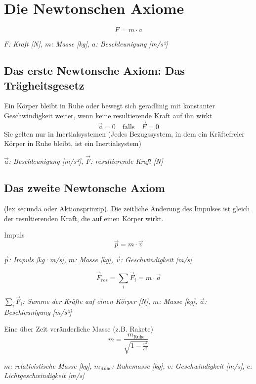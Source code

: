 \documentclass[a4paper,10pt]{article}
\newenvironment{displayformula}
{
	\begin{framed}
		\color{formulaColor}
	}
	{\end{framed}}
\newcommand{\formulalegend}[1]{%
	\par\vspace{0.5ex}%
	{{\color{legendColor}\RaggedRight\small\textit{#1}}}%
	\par\vspace{1.5ex}%
}
\begin{document}
\section{Die Newtonschen Axiome}

\begin{displayformula}
	\[
	F = m \cdot a
	\]
\end{displayformula}
\formulalegend{
	\( F \): Kraft [N], \( m \): Masse [kg], \( a \): Beschleunigung [m/s²]
}

\subsection{Das erste Newtonsche Axiom: Das Trägheitsgesetz}

\begin{displayformula}
	Ein Körper bleibt in Ruhe oder bewegt sich geradlinig mit konstanter Geschwindigkeit weiter, wenn keine resultierende Kraft auf ihn wirkt
	\[
	\vec{a} = 0 \quad \text{falls} \quad \vec{F} = 0
	\]
	Sie gelten nur in Inertialsystemen (Jedes Bezugssystem, in dem ein Kräftefreier Körper in Ruhe bleibt, ist ein Inertialsystem)
\end{displayformula}
\formulalegend{
	\( \vec{a} \): Beschleunigung [m/s²], \( \vec{F} \): resultierende Kraft [N]
}

\subsection{Das zweite Newtonsche Axiom}

\begin{displayformula}
	(lex secunda oder Aktionsprinzip). Die zeitliche Änderung des Impulses ist gleich der  
	resultierenden Kraft, die auf einen Körper wirkt.
\end{displayformula}

\begin{displayformula}
	Impuls
	\[
	\vec{p} = m \cdot \vec{v}
	\]
\end{displayformula}
\formulalegend{
	\( \vec{p} \): Impuls [kg·m/s], \( m \): Masse [kg], \( \vec{v} \): Geschwindigkeit [m/s]
}

\begin{displayformula}
	\[
	\vec{F}_{res} = \sum_{i} \vec{F}_i = m \cdot \vec{a}
	\]
\end{displayformula}
\formulalegend{
	\( \sum_{i} \vec{F}_i \): Summe der Kräfte auf einen Körper [N], \( m \): Masse [kg], \( \vec{a} \): Beschleunigung [m/s²]
}

\begin{displayformula}
	Eine über Zeit veränderliche Masse (z.B. Rakete)
	\[
	m = \frac{m_{\text{Ruhe}}}{\sqrt{1 - \frac{v^2}{c^2}}}
	\]
\end{displayformula}
\formulalegend{
	\( m \): relativistische Masse [kg], \( m_{\text{Ruhe}} \): Ruhemasse [kg], \( v \): Geschwindigkeit [m/s], \( c \): Lichtgeschwindigkeit [m/s]
}
\end{document}
